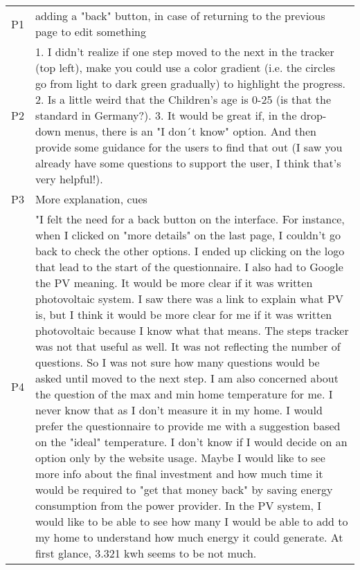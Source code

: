 \begin{center}
    \small
    \begin{longtable}[h!]{ | p{} | p{} | }
        \hline  
        \rowcolor{lightgray} \multicolumn{2}{|c|}{Q6. What would you change about the website to make it more user-friendly?} \\
        \hline
        P1 & adding a "back" button, in case of returning to the previous page to edit something \\
        \hline
        P2 & 1. I didn't realize if one step moved to the next in the tracker (top left), make you could use a color gradient (i.e. the circles go from light to dark green gradually)  to highlight the progress. 2. Is a little weird that the Children's age is 0-25 (is that the standard in Germany?). 3. It would be great if, in the drop-down menus, there is an "I don´t know" option. And then provide some guidance for the users to find that out (I saw you already have some questions to support the user, I think that's very helpful!). \\
        \hline
        P3 & More explanation, cues \\
        \hline
        P4 & "I felt the need for a back button on the interface. For instance, when I clicked on "more details" on the last page, I couldn't go back to check the other options. I ended up clicking on the logo that lead to the start of the questionnaire.
        I also had to Google the PV meaning. It would be more clear if it was written photovoltaic system. I saw there was a link to explain what PV is, but I think it would be more clear for me if it was written photovoltaic because I know what that means. 
        The steps tracker was not that useful as well. It was not reflecting the number of questions. So I was not sure how many questions would be asked until moved to the next step.
        I am also concerned about the question of the max and min home temperature for me. I never know that as I don't measure it in my home. I would prefer the questionnaire to provide me with a suggestion based on the "ideal" temperature. 
        I don't know if I would decide on an option only by the website usage. Maybe I would like to see more info about the final investment and how much time it would be required to "get that money back" by saving energy consumption from the power provider.
        In the PV system, I would like to be able to see how many I would be able to add to my home to understand how much energy it could generate. At first glance, 3.321 kwh seems to be not much.

\end{longtable}
\end{center}

